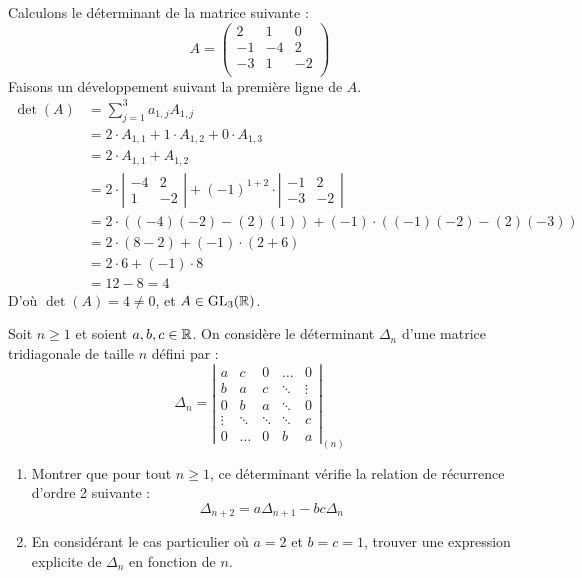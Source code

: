 \documentclass[12pt, a4paper]{report}
\begin{document}
\begin{example}
    Calculons le déterminant de la matrice suivante :
    $$A = \left(\begin{matrix}
    2 & 1 & 0 \\
    -1 & -4 & 2 \\
    -3 & 1 & -2 \\
    \end{matrix}\right)$$
    Faisons un développement suivant la première ligne de $A$.
    \begin{align*}
        \det(A) &= \sum_{j=1}^{3} a_{1,j} A_{1,j} \\
                &= 2 \cdot A_{1,1} + 1 \cdot A_{1,2} + 0 \cdot A_{1,3} \\
                &= 2 \cdot A_{1,1} + A_{1,2} \\
                &= 2 \cdot \left|\begin{matrix}
                -4 & 2 \\
                1 & -2
                \end{matrix}\right| + (-1)^{1+2} \cdot \left|\begin{matrix}
                -1 & 2 \\
                -3 & -2
                \end{matrix}\right| \\
                &= 2 \cdot ( (-4)(-2) - (2)(1) ) + (-1) \cdot ( (-1)(-2) - (2)(-3) ) \\
                &= 2 \cdot (8 - 2) + (-1) \cdot (2 + 6) \\
                &= 2 \cdot 6 + (-1) \cdot 8 \\
                &= 12 - 8 = 4
    \end{align*}
    D'où $\det(A) = 4 \ne 0$, et $A \in \mathrm{GL}_3(\mathbb{R})$.
\end{example}

\begin{exercise}
    Soit $n \ge 1$ et soient $a, b, c \in \mathbb{R}$. On considère le déterminant $\Delta_n$ d'une matrice tridiagonale de taille $n$ défini par :
    $$\Delta_n = \left|\begin{matrix} 
        a & c & 0 & \dots & 0 \\
        b & a & c & \ddots & \vdots \\
        0 & b & a & \ddots & 0 \\
        \vdots & \ddots & \ddots & \ddots & c \\
        0 & \dots & 0 & b & a 
    \end{matrix}\right|_{(n)}$$
    \begin{enumerate}
        \item Montrer que pour tout $n \ge 1$, ce déterminant vérifie la relation de récurrence d'ordre 2 suivante :
    $$\Delta_{n+2} = a\Delta_{n+1} - bc\Delta_n$$
        \item En considérant le cas particulier où $a = 2$ et $b = c = 1$, trouver une expression explicite de $\Delta_n$ en fonction de $n$.
    \end{enumerate}

\end{exercise}
\end{document}
